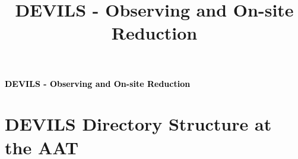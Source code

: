 \documentclass[12pt]{article}
\begin{document}
\title{DEVILS - Observing and On-site Reduction}

\begin{center}
\Large {\textcolor{black}{\textbf{DEVILS - Observing and On-site Reduction}}}
\end{center}
\normalsize


\section{DEVILS Directory Structure at the AAT}
\end{document}
